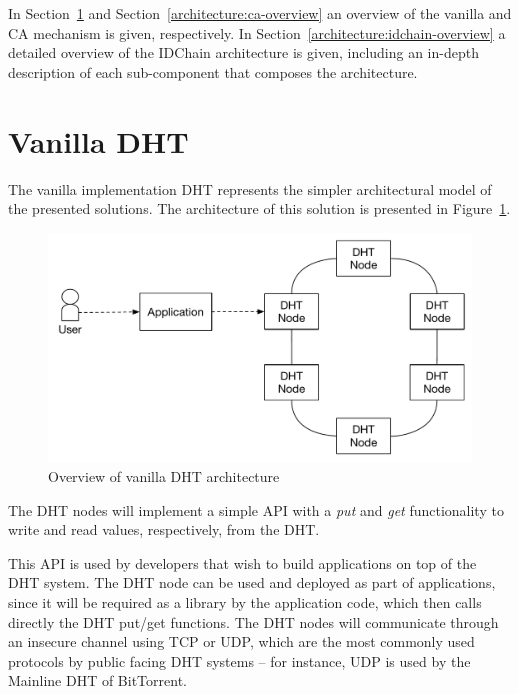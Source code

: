 In Section~\ref{architecture:vanilla-overview} and Section~\ref{architecture:ca-overview} an overview of the vanilla and \ac{CA} mechanism is given, respectively.
In Section~\ref{architecture:idchain-overview} a detailed overview of the IDChain architecture is given, including an in-depth description of each sub-component that composes the architecture.

\section{Vanilla DHT}\label{architecture:vanilla-overview}

The vanilla implementation DHT represents the simpler architectural model of the presented solutions.
The architecture of this solution is presented in Figure~\ref{fig:architecture-vanilla-overview}.

\begin{figure}[htb]
  \centering
  \includegraphics[scale=0.5]{Figures/architecture-overview-none.pdf}
  \caption{Overview of vanilla DHT architecture}
\label{fig:architecture-vanilla-overview}
\end{figure}

The DHT nodes will implement a simple \ac{API} with a \textit{put} and \textit{get} functionality to write and read values, respectively, from the \ac{DHT}.

This \ac{API} is used by developers that wish to build applications on top of the DHT system.
The DHT node can be used and deployed as part of applications, since it will be required as a library by the application code, which then calls directly the DHT put/get functions.
The \ac{DHT} nodes will communicate through an insecure channel using TCP or UDP, which are the most commonly used protocols by public facing DHT systems – for instance, UDP is used by the Mainline DHT of BitTorrent.


